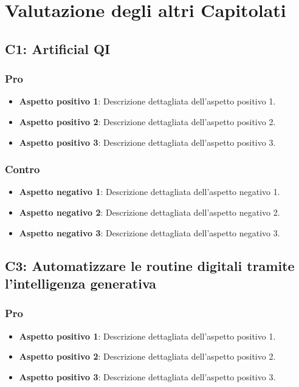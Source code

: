 \section{Valutazione degli altri Capitolati}


\subsection{C1: Artificial QI}

\subsubsection{Pro}

\begin{itemize}
    \item \textbf{Aspetto positivo 1}: Descrizione dettagliata dell'aspetto positivo 1.
    \item \textbf{Aspetto positivo 2}: Descrizione dettagliata dell'aspetto positivo 2.
    \item \textbf{Aspetto positivo 3}: Descrizione dettagliata dell'aspetto positivo 3.
\end{itemize}

\subsubsection{Contro}

\begin{itemize}
    \item \textbf{Aspetto negativo 1}: Descrizione dettagliata dell'aspetto negativo 1.
    \item \textbf{Aspetto negativo 2}: Descrizione dettagliata dell'aspetto negativo 2.
    \item \textbf{Aspetto negativo 3}: Descrizione dettagliata dell'aspetto negativo 3.
\end{itemize}


\subsection{C3:	Automatizzare le routine digitali tramite l’intelligenza generativa}

\subsubsection{Pro}

\begin{itemize}
    \item \textbf{Aspetto positivo 1}: Descrizione dettagliata dell'aspetto positivo 1.
    \item \textbf{Aspetto positivo 2}: Descrizione dettagliata dell'aspetto positivo 2.
    \item \textbf{Aspetto positivo 3}: Descrizione dettagliata dell'aspetto positivo 3.
\end{itemize}

